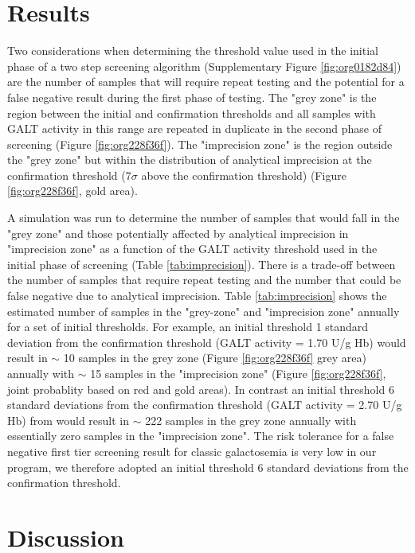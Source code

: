 \documentclass[review]{elsarticle}
\begin{document}
\section*{Results}
\label{sec:orgb345eff}

Two considerations when determining the threshold value used in the
initial phase of a two step screening algorithm (Supplementary Figure
\ref{fig:org0182d84}) are the number of samples that will require repeat
testing and the potential for a false negative result during the first
phase of testing.  The "grey zone" is the region between the initial
and confirmation thresholds and all samples with GALT activity in this
range are repeated in duplicate in the second phase of screening
(Figure \ref{fig:org228f36f}). The "imprecision zone" is the region outside
the "grey zone" but within the distribution of analytical imprecision
at the confirmation threshold (7\(\sigma\) above the confirmation
threshold) (Figure \ref{fig:org228f36f}, gold area). 

A simulation was run to determine the number of samples that would
fall in the "grey zone" and those potentially affected by analytical
imprecision in "imprecision zone" as a function of the GALT activity
threshold used in the initial phase of screening (Table
\ref{tab:imprecision}). There is a trade-off between the number of
samples that require repeat testing and the number that could be false
negative due to analytical imprecision. Table \ref{tab:imprecision}
shows the estimated number of samples in the "grey-zone" and
"imprecision zone" annually for a set of initial thresholds. For
example, an initial threshold 1 standard deviation from the
confirmation threshold (GALT activity = 1.70 U/g Hb) would result in
\(\sim\) 10 samples in the grey zone (Figure \ref{fig:org228f36f} grey area)
annually with \(\sim\) 15 samples in the "imprecision zone" (Figure
\ref{fig:org228f36f}, joint probablity based on red and gold areas). In
contrast an initial threshold 6 standard deviations from the
confirmation threshold (GALT activity = 2.70 U/g Hb) from would result
in \(\sim\) 222 samples in the grey zone annually with essentially zero
samples in the "imprecision zone". The risk tolerance for a false
negative first tier screening result for classic galactosemia is very
low in our program, we therefore adopted an initial threshold 6
standard deviations from the confirmation threshold.

\section*{Discussion}
\label{sec:org5a72e13}
\end{document}
